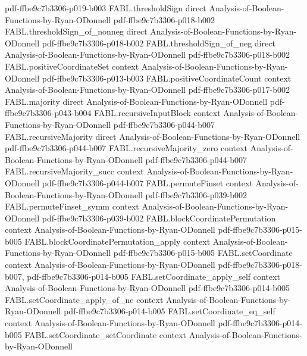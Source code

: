 \begin{theorem}
{    pdf-ffbe9c7b3306-p019-b003}
\proofstep
  {FABL.thresholdSign}
  {direct}
  {Analysis-of-Boolean-Functions-by-Ryan-ODonnell}
  {pdf-ffbe9c7b3306-p018-b002}
\proofstep
  {FABL.thresholdSign_of_nonneg}
  {direct}
  {Analysis-of-Boolean-Functions-by-Ryan-ODonnell}
  {pdf-ffbe9c7b3306-p018-b002}
\proofstep
  {FABL.thresholdSign_of_neg}
  {direct}
  {Analysis-of-Boolean-Functions-by-Ryan-ODonnell}
  {pdf-ffbe9c7b3306-p018-b002}
\proofstep
  {FABL.positiveCoordinateSet}
  {context}
  {Analysis-of-Boolean-Functions-by-Ryan-ODonnell}
  {pdf-ffbe9c7b3306-p013-b003}
\proofstep
  {FABL.positiveCoordinateCount}
  {context}
  {Analysis-of-Boolean-Functions-by-Ryan-ODonnell}
  {pdf-ffbe9c7b3306-p017-b002}
\proofstep
  {FABL.majority}
  {direct}
  {Analysis-of-Boolean-Functions-by-Ryan-ODonnell}
  {pdf-ffbe9c7b3306-p043-b004}
\proofstep
  {FABL.recursiveInputBlock}
  {context}
  {Analysis-of-Boolean-Functions-by-Ryan-ODonnell}
  {pdf-ffbe9c7b3306-p044-b007}
\proofstep
  {FABL.recursiveMajority}
  {direct}
  {Analysis-of-Boolean-Functions-by-Ryan-ODonnell}
  {pdf-ffbe9c7b3306-p044-b007}
\proofstep
  {FABL.recursiveMajority_zero}
  {context}
  {Analysis-of-Boolean-Functions-by-Ryan-ODonnell}
  {pdf-ffbe9c7b3306-p044-b007}
\proofstep
  {FABL.recursiveMajority_succ}
  {context}
  {Analysis-of-Boolean-Functions-by-Ryan-ODonnell}
  {pdf-ffbe9c7b3306-p044-b007}
\proofstep
  {FABL.permuteFinset}
  {context}
  {Analysis-of-Boolean-Functions-by-Ryan-ODonnell}
  {pdf-ffbe9c7b3306-p039-b002}
\proofstep
  {FABL.permuteFinset_symm}
  {context}
  {Analysis-of-Boolean-Functions-by-Ryan-ODonnell}
  {pdf-ffbe9c7b3306-p039-b002}
\proofstep
  {FABL.blockCoordinatePermutation}
  {context}
  {Analysis-of-Boolean-Functions-by-Ryan-ODonnell}
  {pdf-ffbe9c7b3306-p015-b005}
\proofstep
  {FABL.blockCoordinatePermutation_apply}
  {context}
  {Analysis-of-Boolean-Functions-by-Ryan-ODonnell}
  {pdf-ffbe9c7b3306-p015-b005}
\proofstep
  {FABL.setCoordinate}
  {context}
  {Analysis-of-Boolean-Functions-by-Ryan-ODonnell}
  {pdf-ffbe9c7b3306-p018-b007,
    pdf-ffbe9c7b3306-p014-b005}
\proofstep
  {FABL.setCoordinate_apply_self}
  {context}
  {Analysis-of-Boolean-Functions-by-Ryan-ODonnell}
  {pdf-ffbe9c7b3306-p014-b005}
\proofstep
  {FABL.setCoordinate_apply_of_ne}
  {context}
  {Analysis-of-Boolean-Functions-by-Ryan-ODonnell}
  {pdf-ffbe9c7b3306-p014-b005}
\proofstep
  {FABL.setCoordinate_eq_self}
  {context}
  {Analysis-of-Boolean-Functions-by-Ryan-ODonnell}
  {pdf-ffbe9c7b3306-p014-b005}
\proofstep
  {FABL.setCoordinate_setCoordinate}
  {context}
  {Analysis-of-Boolean-Functions-by-Ryan-ODonnell}

\end{theorem}
